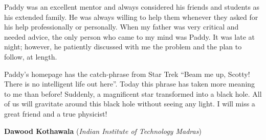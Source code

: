 \documentclass[prd, preprint, longbibliography, 11pt]{revtex4-1}
\begin{document}
Paddy was an excellent mentor and always considered his friends and students as his extended family. He was always  willing to help them whenever they asked for his help professionally or personally. When my father was very critical and needed advice, the only person who came to my mind was Paddy. It was late at night; however, he patiently discussed with me the problem and the plan to follow, at length. 


Paddy’s homepage has the catch-phrase from Star Trek “Beam me up, Scotty! There is no intelligent life out here”. Today this phrase has taken more meaning to me than before! Suddenly, a magnificent star transformed into a black hole. All of us will gravitate around this black hole without seeing any light. I will miss a great friend and a true physicist! 

\bigskip

\bigskip

\centerline{{\bf Dawood Kothawala} ({\it Indian Institute of Technology Madras})}
\medskip
{}
\end{document}
